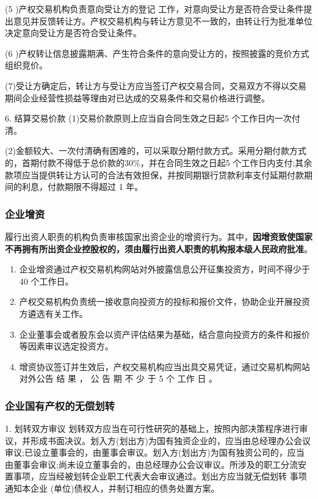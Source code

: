 \documentclass[UTF8,12pt]{ctexart}
\numberwithin{equation}{section} %
\numberwithin{figure}{section}
\numberwithin{table}{section}
\begin{document}
	(5 )产权交易机构负责意向受让方的登记 工作，对意向受让方是否符合受让条件提出意见并反馈转让方。产权交易机构与转让方意见不一致的，由转让行为批准单位决定意向受让方是否符合受让条件。
	
	(6 )产权转让信息披露期满、产生符合条件的意向受让方的，按照披露的竞价方式组织竞价。
	
	(7)受让方确定后，转让方与受让方应当签订产权交易合同，交易双方不得以交易期间企业经营性损益等理由对已达成的交易条件和交易价格进行调整。
	
	6. 结算交易价款
	(1)交易价款原则上应当自合同生效之日起5 个工作日内一次付清。
	
	(2)金额较大、一次付清确有困难的，可以采取分期付款方式。采用分期付款方式的，首期付款不得低于总价款的30\%，并在合同生效之日起5 个工作日内支付;其余款项应当提供转让方认可的合法有效担保，并按同期银行贷款利率支付延期付款期间的利息，付款期限不得超过 1 年。
	
	\subsubsection{企业增资}
	
	履行出资人职责的机构负责审核国家出资企业的增资行为。其中，\textbf{因增资致使国家不再拥有所出资企业控股权的，须由履行出资人职责的机构报本级人民政府批准}。
	\begin{enumerate}
		\item 企业增资通过产权交易机构网站对外披露信息公开征集投资方，时间不得少于40 个工作日。
		
		\item 产权交易机构负责统一接收意向投资方的投标和报价文件，协助企业开展投资方遴选有关工作。
		
		\item 企业董事会或者股东会以资产评估结果为基础，结合意向投资方的条件和报价等因素审议选定投资方。
	
		\item 增资协议签订并生效后，产权交易机构应当出具交易凭证，通过交易机构网站对外公告 结 果 ， 公 告 期 不 少 于 5 个 工作 日 。
	\end{enumerate}
	
	
	\subsubsection{企业国有产权的无偿划转}
	1. 划转双方审议
	划转双方应当在可行性研究的基础上，按照内部决策程序进行审议，并形成书面决议。划入方(划出方)为国有独资企业的，应当由总经理办公会议审议;已设立董事会的，由董事会审议。划入方(划出方)为国有独资公司的，应当由董事会审议;尚未设立董事会的，由总经理办公会议审议。所涉及的职工分流安置事项，应当经被划转企业职工代表大会审议通过。划出方应当就无偿划转 事项通知本企业 (单位)债权人，并制订相应的债务处置方案。
	
\end{document}
